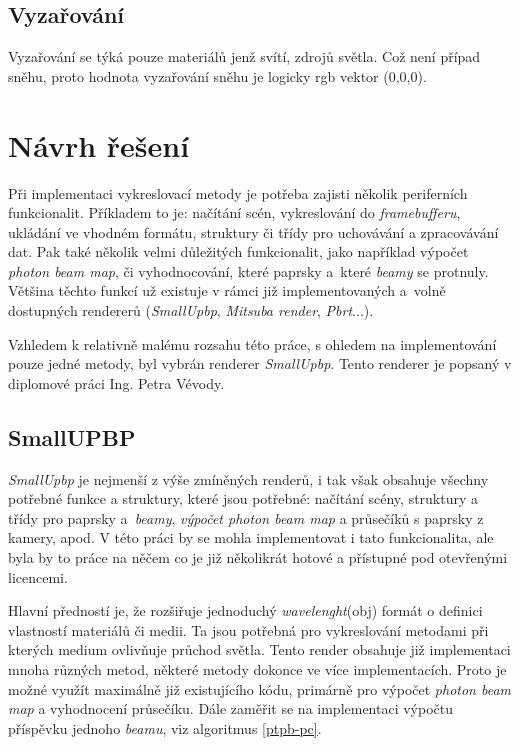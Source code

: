 \section{Vyzařování}
Vyzařování se týká pouze materiálů jenž svítí, zdrojů světla. Což není případ sněhu, proto hodnota vyzařování sněhu je logicky rgb vektor (0,0,0). 

\chapter{Návrh řešení}
Při implementaci vykreslovací metody je potřeba zajisti několik periferních funkcionalit. Příkladem to je: načítání scén, vykreslování do \textit{framebufferu}, ukládání ve vhodném formátu, struktury či třídy pro uchovávání a zpracovávání dat. Pak také několik velmi důležitých funkcionalit, jako například výpočet \textit{photon beam map}, či vyhodnocování, které paprsky a~které \textit{beamy} se protnuly.
Většina těchto funkcí už existuje v rámci již implementovaných a~volně dostupných rendererů (\textit{SmallUpbp}, \textit{Mitsuba render}, \textit{Pbrt}...). 

Vzhledem k relativně malému rozsahu této práce, s ohledem na implementování pouze jedné metody, byl vybrán renderer \textit{SmallUpbp}. Tento renderer je popsaný v diplomové práci\cite{vevoda} Ing. Petra Vévody.
\section{SmallUPBP}
\textit{SmallUpbp}\cite{smallupbp-web} je nejmenší z výše zmíněných renderů, i tak však obsahuje všechny potřebné funkce a struktury, které jsou potřebné: načítání scény, struktury a třídy pro paprsky a~\textit{beamy}, \textit{výpočet photon beam map} a průsečíků s paprsky z kamery, apod. V této práci by se mohla implementovat i tato funkcionalita, ale byla by to práce na něčem co je již několikrát hotové a přístupné pod otevřenými licencemi.

Hlavní předností je, že rozšiřuje jednoduchý \textit{wavelenght}(obj) formát o definici vlastností materiálů či medii. Ta jsou potřebná pro vykreslování metodami při kterých medium ovlivňuje průchod světla. Tento render obsahuje již implementaci mnoha různých metod, některé metody dokonce ve více implementacích. Proto je možné využít maximálně již existujícího kódu, primárně pro výpočet \textit{photon beam map} a vyhodnocení průsečíku. Dále zaměřit se na implementaci výpočtu příspěvku jednoho \textit{beamu}, viz algoritmus \ref{ptpb-pc}. 

